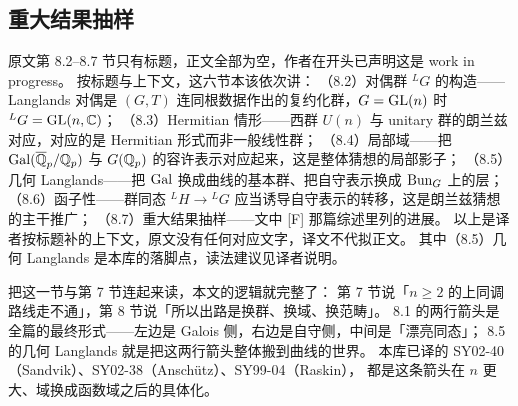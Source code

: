 \subsection{重大结果抽样}
\label{sec:sample}

\begin{yizhu}
原文第 8.2–8.7 节只有标题，正文全部为空，作者在开头已声明这是 work in progress。
按标题与上下文，这六节本该依次讲：
（8.2）对偶群 ${}^{L}G$ 的构造——Langlands 对偶是 $(G,T)$ 连同根数据作出的复约化群，$G=\mathrm{GL}(n)$ 时 ${}^{L}G=\mathrm{GL}(n,\mathbb{C})$；
（8.3）Hermitian 情形——西群 $U(n)$ 与 unitary 群的朗兰兹对应，对应的是 Hermitian 形式而非一般线性群；
（8.4）局部域——把 $\mathrm{Gal}(\overline{\mathbb{Q}}_p/\mathbb{Q}_p)$ 与 $G(\mathbb{Q}_p)$ 的容许表示对应起来，这是整体猜想的局部影子；
（8.5）几何 Langlands——把 $\mathrm{Gal}$ 换成曲线的基本群、把自守表示换成 $\mathrm{Bun}_G$ 上的层；
（8.6）函子性——群同态 ${}^{L}H\to{}^{L}G$ 应当诱导自守表示的转移，这是朗兰兹猜想的主干推广；
（8.7）重大结果抽样——文中 [F] 那篇综述里列的进展。
以上是译者按标题补的上下文，原文没有任何对应文字，译文不代拟正文。
其中（8.5）几何 Langlands 是本库的落脚点，读法建议见译者说明。
\end{yizhu}

\begin{keytakeaways}
把这一节与第 7 节连起来读，本文的逻辑就完整了：
第 7 节说「$n\ge2$ 的上同调路线走不通」，第 8 节说「所以出路是换群、换域、换范畴」。
8.1 的两行箭头是全篇的最终形式——左边是 Galois 侧，右边是自守侧，中间是「漂亮同态」；
8.5 的几何 Langlands 就是把这两行箭头整体搬到曲线的世界。
本库已译的 SY02-40（Sandvik）、SY02-38（Anschütz）、SY99-04（Raskin），
都是这条箭头在 $n$ 更大、域换成函数域之后的具体化。
\end{keytakeaways}

\bigskip

